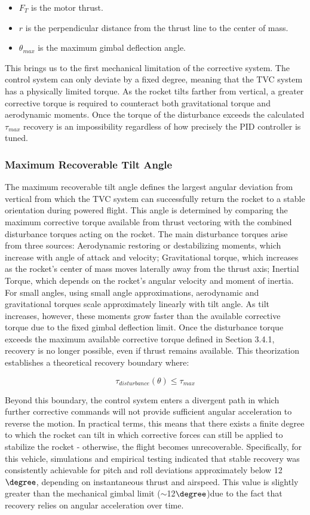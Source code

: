 \begin{itemize}
    \item $F_{T}$ is the motor thrust.
    \item $r$ is the perpendicular distance from the thrust line to the center of mass.
    \item $\theta_{max}$ is the maximum gimbal deflection angle.
\end{itemize}
This brings us to the first mechanical limitation of the corrective system. The control system can only deviate by a fixed degree, meaning that the TVC system has a physically limited torque. As the rocket tilts farther from vertical, a greater corrective torque is required to counteract both gravitational torque and aerodynamic moments. Once the torque of the disturbance exceeds the calculated $\tau_{max}$ recovery is an impossibility regardless of how precisely the PID controller is tuned.

\subsubsection{Maximum Recoverable Tilt Angle}
The maximum recoverable tilt angle defines the largest angular deviation from vertical from which the TVC system can successfully return the rocket to a stable orientation during powered flight. This angle is determined by comparing the maximum corrective torque available from thrust vectoring with the combined disturbance torques acting on the rocket.
The main disturbance torques arise from three sources: Aerodynamic restoring or destabilizing moments, which increase with angle of attack and velocity; Gravitational torque, which increases as the rocket’s center of mass moves laterally away from the thrust axis; Inertial Torque, which depends on the rocket’s angular velocity and moment of inertia. 
For small angles, using small angle approximations, aerodynamic and gravitational torques scale approximately linearly with tilt angle. As tilt increases, however, these moments grow faster than the available corrective torque due to the fixed gimbal deflection limit. Once the disturbance torque exceeds the maximum available corrective torque defined in Section 3.4.1, recovery is no longer possible, even if thrust remains available.
This theorization establishes a theoretical recovery boundary where:

\[\tau_{disturbance}(\theta) \leq \tau_{max}\]

Beyond this boundary, the control system enters a divergent path in which further corrective commands will not provide sufficient angular acceleration to reverse the motion. In practical terms, this means that there exists a finite degree to which the rocket can tilt in which corrective forces can still be applied to stabilize the rocket - otherwise, the flight becomes unrecoverable.
Specifically, for this vehicle, simulations and empirical testing indicated that stable recovery was consistently achievable for pitch and roll deviations approximately below 12$\degree$, depending on instantaneous thrust and airspeed. This value is slightly greater than the mechanical gimbal limit ($\sim$12$\degree$)due to the fact that recovery relies on angular acceleration over time.


